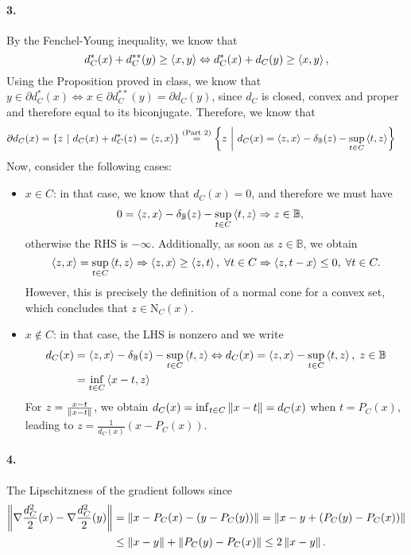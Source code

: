 \documentclass[10pt]{article}
\begin{document}
\paragraph{3.}
By the Fenchel-Young inequality, we know that
\[
    d_C^*(x) + d_C^{**}(y) \geq \left\langle x, y \right\rangle \Leftrightarrow
    d_C^*(x) + d_C(y) \geq \left\langle x, y \right\rangle,
\]
Using the Proposition proved in class, we know that $y \in \partial d_C^*(x)
\Leftrightarrow x \in \partial d_C^{**}(y) = \partial d_C(y)$, since $d_C$ is
closed, convex and proper and therefore equal to its biconjugate. Therefore,
we know that
\begin{align*}
    \partial d_{C}(x) &= \left\{ z \ \middle| \  d_{C}(x) + d^*_{C}(z) = \left\langle z, x \right\rangle \right\}
    \overset{\text{(Part 2)}}{=}
    \left\{ z \ \middle| \  d_{C}(x) = \left\langle z, x \right\rangle - \delta_{\mathbb{B}}(z) - \sup_{t \in C}
    \left\langle t, z \right\rangle \right\}
\end{align*}
Now, consider the following cases:
\begin{itemize}
\item $x \in C$: in that case, we know that $d_{C}(x) = 0$, and therefore we
must have
\begin{align*}
    0 &= \left\langle z, x \right\rangle - \delta_{\mathbb{B}}(z) - \sup_{t \in C} \left\langle t, z \right\rangle
    \Rightarrow z \in \mathbb{B},
\end{align*}
otherwise the RHS is $-\infty$. Additionally, as soon as $z \in \mathbb{B}$, we
obtain
\[
    \left\langle z, x \right\rangle = \sup_{t \in C} \left\langle t, z \right\rangle \Rightarrow
    \left\langle z, x \right\rangle \geq \left\langle z, t \right\rangle, \; \forall t \in C \Rightarrow
    \left\langle z, t - x \right\rangle \leq 0, \; \forall t \in C.
\]
However, this is precisely the definition of a normal cone for a convex set,
which concludes that $z \in \mathrm{N}_{C}(x)$.
\item $x \notin C$: in that case, the LHS is nonzero and we write
\begin{align*}
    d_{C}(x) &= \left\langle z, x \right\rangle - \delta_{\mathbb{B}}(z) - \sup_{t \in C} \left\langle t, z \right\rangle
    \Leftrightarrow d_{C}(x) = \left\langle z, x \right\rangle - \sup_{t \in C} \left\langle t, z \right\rangle, \; z \in
    \mathbb{B} \\
        &= \inf_{t \in C} \left\langle x - t, z \right\rangle
\end{align*}
For $z = \frac{x - t}{\left \| x - t \right \|}$, we obtain $d_{C}(x) = \inf_{t \in C}
\left \| x - t \right \| = d_{C}(x)$ when $t = P_C(x)$, leading to $z = \frac{1}{d_{C}(x)}
(x - P_C(x))$.
\end{itemize}
\paragraph{4.}
The Lipschitzness of the gradient follows since
\begin{align*}
    \left \| \nabla \frac{d_C^2}{2}(x) - \nabla \frac{d_C^2}{2}(y) \right \| &=
    \left \| x - P_C(x) - (y - P_C(y)) \right \| = \left \| x - y + (P_C(y) - P_C(x)) \right \| \\
    &\leq \left \| x - y \right \| + \left \| P_C(y) - P_C(x) \right \| \leq 2 \left \| x - y \right \|.
\end{align*}
\end{document}
